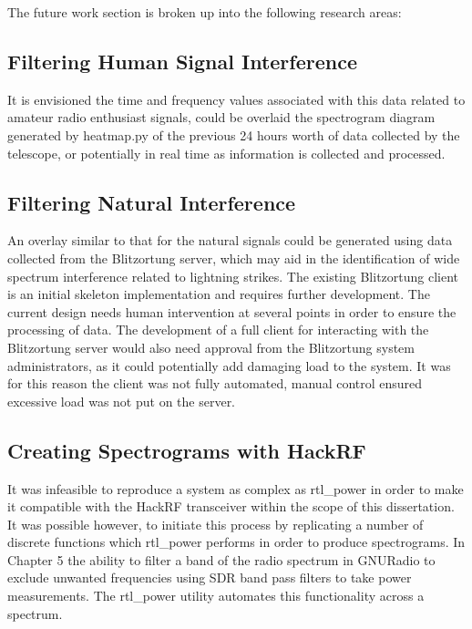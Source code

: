 The future work section is broken up into the following research areas:

\subsection*{Filtering Human Signal Interference}

It is envisioned the time and frequency values associated with this data related to amateur radio enthusiast signals, could be overlaid the spectrogram diagram generated by heatmap.py of the previous 24 hours worth of data collected by the telescope, or potentially in real time as information is collected and processed.

\subsection*{Filtering Natural Interference}

An overlay similar to that for the natural signals could be generated using data collected from the Blitzortung server, which may aid in the identification of wide spectrum interference related to lightning strikes. The existing Blitzortung client is an initial skeleton implementation and requires further development. The current design needs human intervention at several points in order to ensure the processing of data. The development of a full client for interacting with the Blitzortung server would also need approval from the Blitzortung system administrators, as it could potentially add damaging load to the system. It was for this reason the client was not fully automated, manual control ensured excessive load was not put on the server.

\subsection*{Creating Spectrograms with HackRF}

It was infeasible to reproduce a system as complex as rtl\_power in order to make it compatible with the HackRF transceiver within the scope of this dissertation. It was possible however, to initiate this process by replicating a number of discrete functions which rtl\_power performs in order to produce spectrograms. In Chapter 5 the ability to filter a band of the radio spectrum in GNURadio to exclude unwanted frequencies using \gls{SDR} band pass filters to take power measurements. The rtl\_power utility automates this functionality across a spectrum. 

